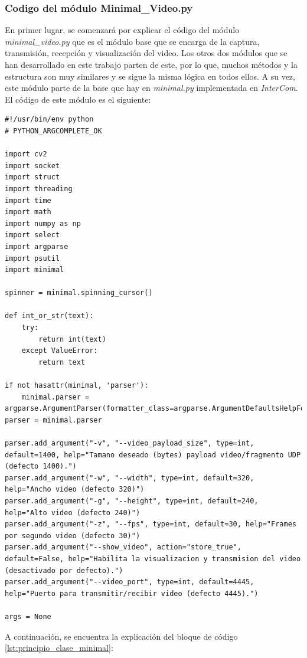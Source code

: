 \subsubsection{Codigo del módulo Minimal\_Video.py}

En primer lugar, se comenzará por explicar el código del módulo \textit{minimal\_video.py} que es el módulo base que se encarga de la captura, transmisión, recepción y visualización del video. Los otros dos módulos que se han desarrollado en este trabajo parten de este, por lo que, muchos métodos y la estructura son muy similares y se sigue la misma lógica en todos ellos. A su vez, este módulo parte de la base que hay en \textit{minimal.py} implementada en \textit{InterCom}. El código de este módulo es el siguiente:
\begin{lstlisting}[style=pythonstyle, caption={Comienzo del módulo \textit{minimal\_video.py} y sus parámetros}, label={lst:principio_clase_minimal}]
#!/usr/bin/env python
# PYTHON_ARGCOMPLETE_OK

import cv2
import socket
import struct
import threading
import time
import math
import numpy as np
import select
import argparse
import psutil
import minimal

spinner = minimal.spinning_cursor()

def int_or_str(text):
    try:
        return int(text)
    except ValueError:
        return text

if not hasattr(minimal, 'parser'):
    minimal.parser = argparse.ArgumentParser(formatter_class=argparse.ArgumentDefaultsHelpFormatter)
parser = minimal.parser

parser.add_argument("-v", "--video_payload_size", type=int, default=1400, help="Tamano deseado (bytes) payload video/fragmento UDP (defecto 1400).")
parser.add_argument("-w", "--width", type=int, default=320, help="Ancho video (defecto 320)")
parser.add_argument("-g", "--height", type=int, default=240, help="Alto video (defecto 240)")
parser.add_argument("-z", "--fps", type=int, default=30, help="Frames por segundo video (defecto 30)")
parser.add_argument("--show_video", action="store_true", default=False, help="Habilita la visualizacion y transmision del video (desactivado por defecto).")
parser.add_argument("--video_port", type=int, default=4445, help="Puerto para transmitir/recibir video (defecto 4445).")

args = None
\end{lstlisting}

A continuación, se encuentra la explicación del bloque de código \ref{lst:principio_clase_minimal}:

